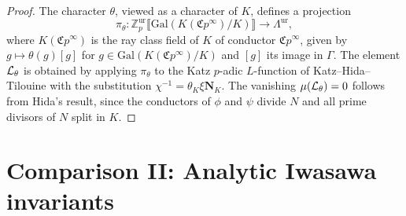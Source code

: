 \begin{proof}
  The character \(\theta\), viewed as a character of \(K\), defines a projection
  \[
    \pi_\theta : \mathbb{Z}_p^{\mathrm{ur}}\llbracket\mathrm{Gal}(K(\mathfrak{C}p^\infty)/K)\rrbracket \longrightarrow \Lambda^{\mathrm{ur}},
  \]
  where \(K(\mathfrak{C}p^\infty)\) is the ray class field of \(K\) of conductor \(\mathfrak{C}p^\infty\), given by \(g\mapsto\theta(g)[g]\) for \(g\in\mathrm{Gal}(K(\mathfrak{C}p^\infty)/K)\) and \([g]\) its image in \(\Gamma\). The element \(\mathcal{L}_\theta\) is obtained by applying \(\pi_\theta\) to the Katz \(p\)-adic \(L\)-function of Katz--Hida--Tilouine with the substitution \(\chi^{-1} = \theta_K\xi\mathbf{N}_K\). The vanishing \(\mu(\mathcal{L}_\theta) = 0\) follows from Hida's result, since the conductors of \(\phi\) and \(\psi\) divide \(N\) and all prime divisors of \(N\) split in \(K\).
\end{proof}

\section{Comparison II: Analytic Iwasawa invariants}


